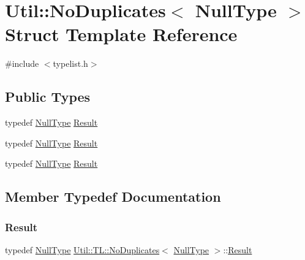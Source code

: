 \hypertarget{structUtil_1_1TL_1_1NoDuplicates_3_01NullType_01_4}{}\section{Util\+:\+:No\+Duplicates$<$ Null\+Type $>$ Struct Template Reference}
\label{structUtil_1_1TL_1_1NoDuplicates_3_01NullType_01_4}


{\ttfamily \#include $<$typelist.\+h$>$}

\subsection*{Public Types}
\begin{DoxyCompactItemize}
\item 
typedef \mbox{\hyperlink{classUtil_1_1NullType}{Null\+Type}} \mbox{\hyperlink{structUtil_1_1TL_1_1NoDuplicates_3_01NullType_01_4_abb8d5323219cad8bdeef505d43773254}{Result}}
\item 
typedef \mbox{\hyperlink{classUtil_1_1NullType}{Null\+Type}} \mbox{\hyperlink{structUtil_1_1TL_1_1NoDuplicates_3_01NullType_01_4_abb8d5323219cad8bdeef505d43773254}{Result}}
\item 
typedef \mbox{\hyperlink{classUtil_1_1NullType}{Null\+Type}} \mbox{\hyperlink{structUtil_1_1TL_1_1NoDuplicates_3_01NullType_01_4_abb8d5323219cad8bdeef505d43773254}{Result}}
\end{DoxyCompactItemize}


\subsection{Member Typedef Documentation}
\mbox{\label{structUtil_1_1TL_1_1NoDuplicates_3_01NullType_01_4_abb8d5323219cad8bdeef505d43773254}} 
\subsubsection{\texorpdfstring{Result}{Result}\hspace{0.1cm}{\footnotesize\ttfamily [1/3]}}
{\footnotesize\ttfamily typedef \mbox{\hyperlink{classUtil_1_1NullType}{Null\+Type}} \mbox{\hyperlink{structUtil_1_1TL_1_1NoDuplicates}{Util\+::\+T\+L\+::\+No\+Duplicates}}$<$ \mbox{\hyperlink{classUtil_1_1NullType}{Null\+Type}} $>$\+::\mbox{\hyperlink{structUtil_1_1TL_1_1NoDuplicates_3_01NullType_01_4_abb8d5323219cad8bdeef505d43773254}{Result}}}

